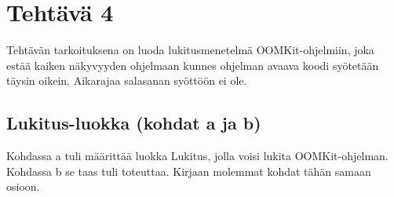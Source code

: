 
\chapter{Tehtävä 4 \label{chap:Teht=0000E4v=0000E4-1}}

Tehtävän tarkoituksena on luoda lukitusmenetelmä OOMKit-ohjelmiin, joka estää kaiken näkyvyyden ohjelmaan kunnes ohjelman avaava koodi syötetään täysin oikein. Aikarajaa salasanan syöttöön ei ole.

\section{Lukitus-luokka (kohdat a ja b)}

\label{Lukitus-luokka}

Kohdassa a tuli määrittää luokka Lukitus, jolla voisi lukita OOMKit-ohjelman. Kohdassa b se taas tuli toteuttaa. Kirjaan molemmat kohdat tähän samaan osioon.

